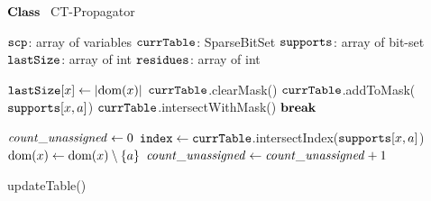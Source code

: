\STATE $\textbf{Class~}$ CT-Propagator
    \item[]
      \STATE $\texttt{scp}$: array of variables
      \STATE $\texttt{currTable}$: SparseBitSet 
      \STATE $\texttt{supports}$: array of bit-set   
      \STATE $\texttt{lastSize}$: array of int 
      \STATE $\texttt{residues}$: array of int  
            
    \item[]
       \label{line:updateTable:1} 
       \label{line:updateTable:2} 
        \STATE $\texttt{lastSize}[x] \leftarrow |\text{dom}({x})|$ \label{line:updateTable:3} 
        \STATE $\texttt{currTable}$.clearMask() \label{line:updateTable:4} 
         \label{line:updateTable:5} 
          \STATE $\texttt{currTable}$.addToMask($\texttt{supports}[x,a]$) \label{line:updateTable:6} 
        \ENDFOREACH      
        \STATE $\texttt{currTable}$.intersectWithMask() \label{line:updateTable:7} 
         \label{line:updateTable:8} 
          \STATE $\textbf{break~}$  \label{line:updateTable:9} 
        \ENDIF
      \ENDFOREACH
      \Endfunc


    \item[]
       \label{line:filterDom:0}
      \STATE $\mathit{count\_unassigned} \leftarrow 0$ \label{line:filterDom:1}
       \label{line:filterDom:2}
             \label{line:filterDom:3}
                  \STATE $\texttt{index} \leftarrow \texttt{currTable}$.intersectIndex($\texttt{supports}[x,a]$) \label{line:filterDom:4}
                   \label{line:filterDom:5}
                        \STATE {}  \label{line:filterDom:6}
                  \ELSE
                        \STATE $\text{dom}({x}) \leftarrow \text{dom}({x}) \setminus \left\{a\right\}$ \label{line:filterDom:7}
                         \label{line:filterDom:8}
                           \STATE $\mathit{count\_unassigned} \leftarrow \mathit{count\_unassigned} + 1$\label{line:filterDom:9}
                        \ENDIF
                  \ENDIF
             \ENDFOREACH
      \ENDFOREACH
       \label{line:filterDom:10}
         \label{line:filterDom:11}
      \ELSE
         \label{line:filterDom:12}
      \ENDIF
      \Endfunc

    \item[]
              \STATE updateTable()
              \ENDIF
         \Endfunc
